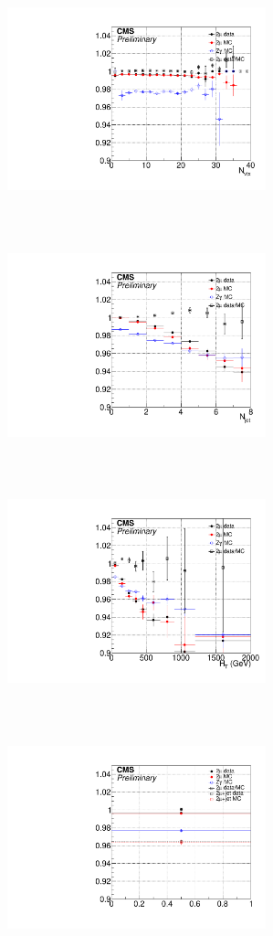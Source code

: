 \begin{figure}[tbph]
 \centering
  \includegraphics[width=7.5cm,height=7cm]{Analysis/Figures/leptonveto/leptonveto_eff_npv.pdf}
  \includegraphics[width=7.5cm,height=7cm]{Analysis/Figures/leptonveto/leptonveto_eff_njet.pdf}
  \includegraphics[width=7.5cm,height=7cm]{Analysis/Figures/leptonveto/leptonveto_eff_ht.pdf}
  \includegraphics[width=7.5cm,height=7cm]{Analysis/Figures/leptonveto/leptonveto_eff_incl.pdf}

\end{figure}

